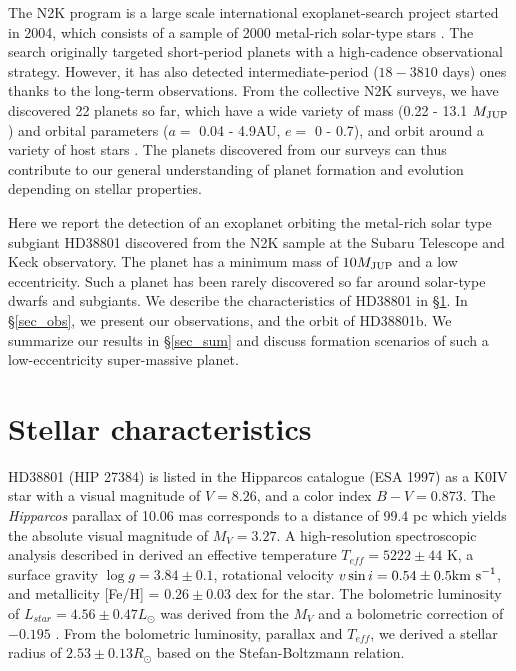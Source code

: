 \documentclass[manuscript]{aastex}
\newcommand{\mjup}{M_{\rm JUP}}
\begin{document}
The N2K program is a large scale international exoplanet-search project started in 2004,
which consists of a sample of 2000 metal-rich solar-type stars \citep{2005ApJ...622.1102F}.
The search originally targeted short-period planets with a high-cadence observational strategy.
However, it has also detected intermediate-period ($18 - 3810$ days) ones thanks to the long-term observations.
From the collective N2K surveys, we have discovered 22 planets so far, which have a wide variety of mass (0.22 - 13.1 $\mjup$) and orbital parameters ($a=$ 0.04 - 4.9AU, $e=$ 0 - 0.7), and orbit around a variety of host stars \citep[$-0.11 < {\rm [Fe/H]} < 0.37, 0.88 < M/M_{\odot} < 1.31$;][]{2007ApJ...657..533W,2006ApJ...647..600J,2009PASP..121..613P}.
The planets discovered from our surveys can thus contribute to our general understanding of planet formation and evolution depending on stellar properties.

Here we report the detection of an exoplanet orbiting the metal-rich solar type subgiant HD38801 discovered from the N2K sample at the Subaru Telescope and Keck observatory. 
The planet has a minimum mass of $10\mjup$ and a low eccentricity.
Such a planet has been rarely discovered so far around solar-type dwarfs and subgiants.
We describe the characteristics of HD38801 in \S \ref{sec_str}. In \S \ref{sec_obs}, we present our observations, and the orbit of HD38801b. We summarize our results in \S \ref{sec_sum} and discuss formation scenarios of such a low-eccentricity super-massive planet.

\section{Stellar characteristics}
\label{sec_str}
HD38801 (HIP 27384) is listed in the Hipparcos catalogue (ESA 1997) as a K0IV star with a visual magnitude 
of $V=8.26$, and a color index $B-V=0.873$. The {\it Hipparcos} parallax of 10.06 mas corresponds to a distance 
of 99.4 pc which yields the absolute visual magnitude of $M_V = 3.27$. A high-resolution spectroscopic analysis 
described in \cite{2005yCat..21590141V} derived an effective temperature $T_{eff} = 5222\pm44$ K, a surface gravity $\log g = 3.84\pm0.1$, rotational velocity $v\sin i = 0.54\pm0.5 {\rm km\ s}^{-1}$, and metallicity [Fe/H] = $0.26\pm0.03$ dex for the star.
The bolometric luminosity of $L_{star} = 4.56\pm0.47L_{\odot}$ was derived from the $M_V$ and a bolometric correction of $-0.195$ \citep{1996ApJ...469..355F}.
From the bolometric luminosity, parallax and $T_{eff}$, we derived a stellar radius of $2.53\pm0.13R_{\odot}$ based on the Stefan-Boltzmann relation. 
\end{document}
